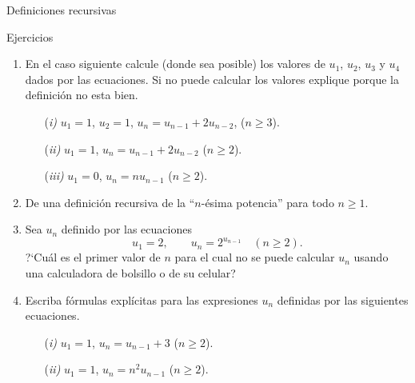 \documentclass[11pt,spanish,makeidx]{amsbook}
\theoremstyle{definition}
\theoremstyle{remark}
\begin{document}
\begin{section}{Definiciones recursivas}
\begin{subsection}{Ejercicios}
\begin{enumerate}
\item En el caso siguiente calcule (donde sea posible) los valores de $u_1$, $u_2$, $u_3$ y $u_4$ dados por las ecuaciones. Si no puede calcular los valores explique porque la definición no esta bien.
\begin{enumerate}
\item[(\em i)] $u_1 = 1$, $u_2=1$, $u_n = u_{n-1} +2 u_{n-2}$, ($n \ge 3$). 
\item[(\em ii)] $u_1 = 1$, $u_n = u_{n-1} +2u_{n-2}$ ($n \ge 2$). 
\item[(\em iii)] $u_1 = 0$, $u_n = nu_{n-1}$ ($n \ge 2$).
\end{enumerate}
\item De una definición recursiva de la ``$n$-ésima potencia'' para todo $n\ge 1$.
\item Sea $u_n$ definido por las ecuaciones
$$
u_1=2,\qquad u_n= 2^{u_{n-1}} \quad (n\ge 2).
$$
?`Cuál es el primer valor de $n$ para el cual no se puede calcular $u_n$ usando una calculadora de bolsillo o de su celular?
\item Escriba fórmulas explícitas para las expresiones $u_n$ definidas por las siguientes ecuaciones.
\begin{enumerate}
\item[(\em i)] $u_1 = 1$, $u_n = u_{n-1} +3$ ($n \ge 2$). 
\item[(\em ii)] $u_1 = 1$, $u_n = n^2u_{n-1}$ ($n \ge 2$).
\end{enumerate}
\end{enumerate}
\end{subsection}
\end{section}
\end{document}

